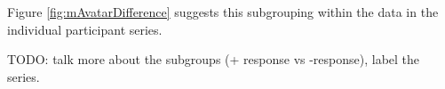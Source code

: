 Figure \ref{fig:mAvatarDifference} suggests this subgrouping within the data in the individual participant series.

TODO: talk more about the subgroups (+ response vs -response), label the series.

